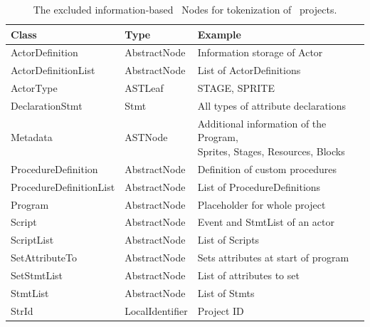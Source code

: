 \begin{table}[H]
    \caption[The excluded information-based \AST\ Nodes]{\label{tab:excluded-metadata}The excluded information-based \AST\ Nodes for tokenization of \scratch\ projects.}

    \begin{tabular}[t]{lll}
    	\toprule
    	Class & Type & Example \\
    	\midrule
    	\vspace{10pt}
    	    ActorDefinition & AbstractNode & Information storage of Actor \\
    	    \vspace{10pt} 
    	    ActorDefinitionList & AbstractNode & List of ActorDefinitions \\
    	    \vspace{10pt}
        ActorType & ASTLeaf & STAGE, SPRITE \\  
        \vspace{10pt}
        DeclarationStmt & Stmt & All types of attribute declarations\\
        \vspace{10pt}
        Metadata & ASTNode & \parbox[t]{7cm}{Additional information of the Program,\\ Sprites, Stages, Resources, Blocks} \\
        \vspace{10pt}
        ProcedureDefinition & AbstractNode & Definition of custom procedures \\
        \vspace{10pt}
        ProcedureDefinitionList & AbstractNode & List of ProcedureDefinitions \\
        \vspace{10pt}
        Program & AbstractNode & Placeholder for whole project\\
        \vspace{10pt}
        Script & AbstractNode & Event and StmtList of an actor \\  
        \vspace{10pt}
        ScriptList & AbstractNode & List of Scripts \\
        \vspace{10pt}
        SetAttributeTo & AbstractNode & Sets attributes at start of program \\
        \vspace{10pt} 
        SetStmtList & AbstractNode & List of attributes to set \\
        \vspace{10pt}
        StmtList & AbstractNode & List of Stmts \\
        \vspace{10pt}
        StrId & LocalIdentifier & Project ID \\            
    \bottomrule
    \end{tabular}
\end{table}


